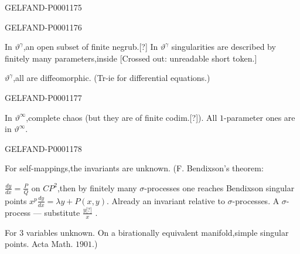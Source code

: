 \begin{GelfandAdjacentEvidence}{GELFAND-P000117}{5}


\end{GelfandAdjacentEvidence}
\begin{GelfandAdjacentEvidence}{GELFAND-P000117}{6}

In $\vartheta^\gamma$,an open subset of finite negrub.[?]
In $\vartheta^\gamma$ singularities are described by finitely many parameters,inside
[Crossed out: unreadable short token.]

$\vartheta^\gamma$,all are diffeomorphic. (Tr-ie for differential equations.)
\end{GelfandAdjacentEvidence}
\begin{GelfandAdjacentEvidence}{GELFAND-P000117}{7}


In $\vartheta^\infty$,complete chaos (but they are of finite codim.[?]).
All $1$-parameter ones are in $\vartheta^\infty$.
\end{GelfandAdjacentEvidence}
\begin{GelfandAdjacentEvidence}{GELFAND-P000117}{8}

For self-mappings,the invariants are unknown.
(F. Bendixson's theorem:

$\frac{dy}{dx}=\frac{P}{Q}$ on $CP^2$,then by finitely many $\sigma$-processes
one reaches Bendixson singular points
$x^p\frac{dy}{dx}=\lambda y+P(x,y)$.
Already an invariant relative to $\sigma$-processes.
A $\sigma$-process — substitute $\frac{y\text{[?]}}{x}$ . 

For $3$ variables unknown. On a birationally equivalent manifold,simple singular points.
Acta Math. $1901$.)
\end{GelfandAdjacentEvidence}
